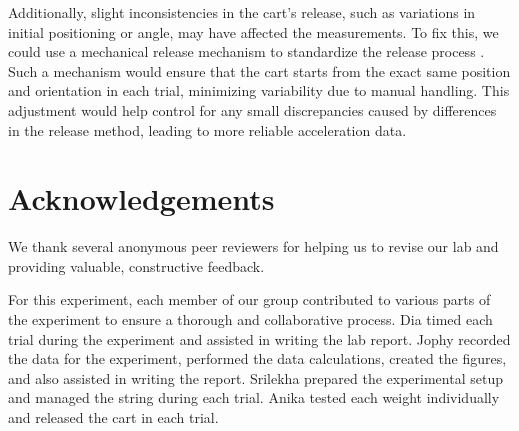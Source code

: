 ﻿\documentclass[reprint,amsmath,amssymb,aps]{revtex4-2}
\begin{document}
Additionally, slight inconsistencies in the cart’s release, such as variations in initial positioning or angle, may have affected the measurements. To fix this, we could use a mechanical release mechanism to standardize the release process \cite{taylor1997introduction}. Such a mechanism would ensure that the cart starts from the exact same position and orientation in each trial, minimizing variability due to manual handling. This adjustment would help control for any small discrepancies caused by differences in the release method, leading to more reliable acceleration data.





\section{Acknowledgements}
We thank several anonymous peer reviewers for helping us to revise our lab and providing valuable, constructive feedback. 

For this experiment, each member of our group contributed to various parts of the experiment to ensure a thorough and collaborative process. Dia timed each trial during the experiment and assisted in writing the lab report. Jophy recorded the data for the experiment, performed the data calculations, created the figures, and also assisted in writing the report. Srilekha prepared the experimental setup and managed the string during each trial. Anika tested each weight individually and released the cart in each trial. 


%

\end{document}
